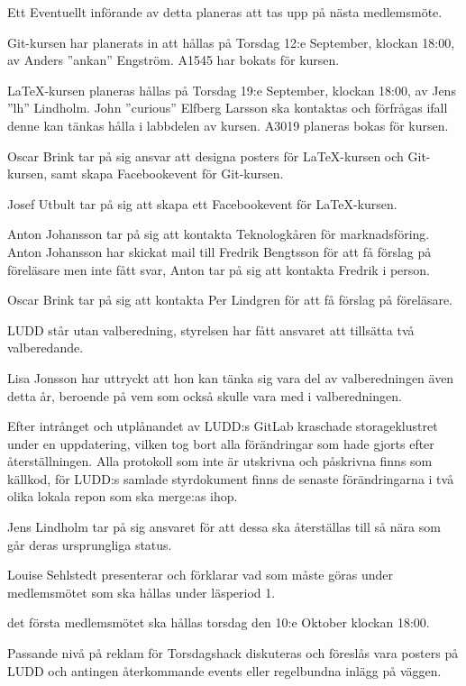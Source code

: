 \documentclass{protokoll}
\begin{document}
Ett Eventuellt införande av detta planeras att tas upp på nästa medlemsmöte. 

Git-kursen har planerats in att hållas på Torsdag 12:e September, klockan 
18:00, av Anders ''ankan'' Engström. A1545 har bokats för kursen. 


LaTeX-kursen planeras hållas på Torsdag 19:e September, klockan 18:00, av Jens
''lh'' Lindholm. John ''curious'' Elfberg Larsson ska kontaktas och förfrågas
ifall denne kan tänkas hålla i labbdelen av kursen. A3019 planeras bokas för
kursen. 


Oscar Brink tar på sig ansvar att designa posters för LaTeX-kursen och
Git-kursen, samt skapa Facebookevent för Git-kursen. 


Josef Utbult tar på sig att skapa ett Facebookevent för LaTeX-kursen.


Anton Johansson tar på sig att kontakta Teknologkåren för marknadsföring.
Anton Johansson har skickat mail till Fredrik Bengtsson för att få förslag på
föreläsare men inte fått svar, Anton tar på sig att kontakta Fredrik i person.


Oscar Brink tar på sig att kontakta Per Lindgren för att få förslag på
föreläsare. 

LUDD står utan valberedning, styrelsen har fått ansvaret att tillsätta två
valberedande. 


Lisa Jonsson har uttryckt att hon kan tänka sig vara del av valberedningen
även detta år, beroende på vem som också skulle vara med i valberedningen. 

Efter intrånget och utplånandet av LUDD:s GitLab kraschade storageklustret under
en uppdatering, vilken tog bort alla förändringar som hade gjorts efter
återställningen. Alla protokoll som inte är utskrivna och påskrivna finns som
källkod, för LUDD:s samlade styrdokument finns de senaste förändringarna i två
olika lokala repon som ska merge:as ihop. 


Jens Lindholm tar på sig ansvaret för att dessa ska återställas till så nära
som går deras ursprungliga status. 

Louise Sehlstedt presenterar och förklarar vad som måste göras under
medlemsmötet som ska hållas under läsperiod 1. 

\begin{beslut}
  \att det första medlemsmötet ska hållas torsdag den 10:e Oktober klockan
  18:00.
\end{beslut}
Passande nivå på reklam för Torsdagshack diskuteras och föreslås vara posters 
på LUDD och antingen återkommande events eller regelbundna inlägg på väggen. 
\end{document}
